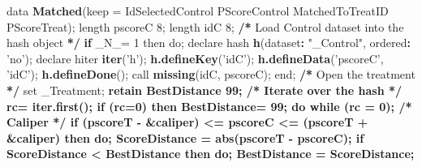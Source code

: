 \documentclass[]{article}
\newenvironment{Shaded}{\begin{snugshade}}{\end{snugshade}}
\newcommand{\KeywordTok}[1]{\textcolor[rgb]{0.13,0.29,0.53}{\textbf{#1}}}
\newcommand{\DataTypeTok}[1]{\textcolor[rgb]{0.13,0.29,0.53}{#1}}
\newcommand{\DecValTok}[1]{\textcolor[rgb]{0.00,0.00,0.81}{#1}}
\newcommand{\StringTok}[1]{\textcolor[rgb]{0.31,0.60,0.02}{#1}}
\newcommand{\ControlFlowTok}[1]{\textcolor[rgb]{0.13,0.29,0.53}{\textbf{#1}}}
\newcommand{\OperatorTok}[1]{\textcolor[rgb]{0.81,0.36,0.00}{\textbf{#1}}}
\newcommand{\ErrorTok}[1]{\textcolor[rgb]{0.64,0.00,0.00}{\textbf{#1}}}
\newcommand{\NormalTok}[1]{#1}
\begin{document}
\begin{Shaded}
\begin{Highlighting}[]
{{\NormalTok{ data }\KeywordTok{Matched}\NormalTok{(}\DataTypeTok{keep =}\NormalTok{ IdSelectedControl PScoreControl MatchedToTreatID PScoreTreat);}
\NormalTok{  length pscoreC }\DecValTok{8}\NormalTok{;}
\NormalTok{  length idC }\DecValTok{8}\NormalTok{;}
\OperatorTok{/}\ErrorTok{*}\StringTok{ }\NormalTok{Load Control dataset into the hash object }\OperatorTok{*}\ErrorTok{/}
\StringTok{  }\ControlFlowTok{if}\NormalTok{ _N_=}\StringTok{ }\DecValTok{1}\NormalTok{ then do;}
\NormalTok{declare hash }\KeywordTok{h}\NormalTok{(dataset}\OperatorTok{:}\StringTok{ "_Control"}\NormalTok{, ordered}\OperatorTok{:}\StringTok{ 'no'}\NormalTok{);}
\NormalTok{declare hiter }\KeywordTok{iter}\NormalTok{(}\StringTok{'h'}\NormalTok{);}
\KeywordTok{h.defineKey}\NormalTok{(}\StringTok{'idC'}\NormalTok{);}
\KeywordTok{h.defineData}\NormalTok{(}\StringTok{'pscoreC'}\NormalTok{, }\StringTok{'idC'}\NormalTok{);}
\KeywordTok{h.defineDone}\NormalTok{();}
\NormalTok{call }\KeywordTok{missing}\NormalTok{(idC, pscoreC);}
\NormalTok{end;}
\OperatorTok{/}\ErrorTok{*}\StringTok{ }\NormalTok{Open the treatment }\OperatorTok{*}\ErrorTok{/}
\NormalTok{set _Treatment;}
\OperatorTok{%if %}\KeywordTok{upcase}\NormalTok{(}\OperatorTok{&}\NormalTok{method) }\OperatorTok{~}\ErrorTok{=}\StringTok{ }\NormalTok{RADIUS }\OperatorTok{%then %}\NormalTok{do;}
\NormalTok{retain BestDistance }\DecValTok{99}\NormalTok{;}
\NormalTok{%end;}
\OperatorTok{/}\ErrorTok{*}\StringTok{ }\NormalTok{Iterate over the hash }\OperatorTok{*}\ErrorTok{/}
\NormalTok{rc=}\StringTok{ }\KeywordTok{iter.first}\NormalTok{();}
\ControlFlowTok{if}\NormalTok{ (}\DataTypeTok{rc=}\DecValTok{0}\NormalTok{) then BestDistance=}\StringTok{ }\DecValTok{99}\NormalTok{;}
\NormalTok{do }\ControlFlowTok{while}\NormalTok{ (}\DataTypeTok{rc =} \DecValTok{0}\NormalTok{);}
\OperatorTok{/}\ErrorTok{*}\StringTok{ }\NormalTok{Caliper }\OperatorTok{*}\ErrorTok{/}
\OperatorTok{%if %}\KeywordTok{upcase}\NormalTok{(}\OperatorTok{&}\NormalTok{method) =}\StringTok{ }\NormalTok{CALIPER }\OperatorTok{%then %}\NormalTok{do;}
\ControlFlowTok{if}\NormalTok{ (pscoreT }\OperatorTok{-}\StringTok{ }\ErrorTok{&}\NormalTok{caliper) }\OperatorTok{<=}\StringTok{ }\NormalTok{pscoreC }\OperatorTok{<=}\StringTok{ }\NormalTok{(pscoreT }\OperatorTok{+}\StringTok{ }\ErrorTok{&}\NormalTok{caliper) then do;}
\NormalTok{ScoreDistance =}\StringTok{ }\KeywordTok{abs}\NormalTok{(pscoreT }\OperatorTok{-}\StringTok{ }\NormalTok{pscoreC);}
\ControlFlowTok{if}\NormalTok{ ScoreDistance }\OperatorTok{<}\StringTok{ }\NormalTok{BestDistance then do;}
\NormalTok{BestDistance =}\StringTok{ }\NormalTok{ScoreDistance;}
}}}}}
\end{Highlighting}
\end{Shaded}
\end{document}
